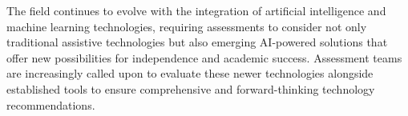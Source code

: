 The field continues to evolve with the integration of artificial intelligence and machine learning technologies, requiring assessments to consider not only traditional assistive technologies but also emerging AI-powered solutions that offer new possibilities for independence and academic success. Assessment teams are increasingly called upon to evaluate these newer technologies alongside established tools to ensure comprehensive and forward-thinking technology recommendations.
